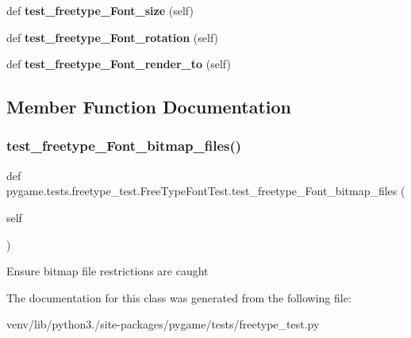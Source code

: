 \begin{DoxyCompactItemize}
def {\bfseries test\+\_\+freetype\+\_\+\+Font\+\_\+size} (self)
\item 
\mbox{\label{classpygame_1_1tests_1_1freetype__test_1_1_free_type_font_test_a16d7f968ed53f3d8fe22819a3d83440b}} 
def {\bfseries test\+\_\+freetype\+\_\+\+Font\+\_\+rotation} (self)
\item 
\mbox{\label{classpygame_1_1tests_1_1freetype__test_1_1_free_type_font_test_a6f72ba8f6d0e317b2aec8b9e5d7ef366}} 
def {\bfseries test\+\_\+freetype\+\_\+\+Font\+\_\+render\+\_\+to} (self)
\end{DoxyCompactItemize}


\subsection{Member Function Documentation}
\mbox{\label{classpygame_1_1tests_1_1freetype__test_1_1_free_type_font_test_a8e09fa3a283708a2565478d0bacb6c98}} 
\subsubsection{\texorpdfstring{test\+\_\+freetype\+\_\+\+Font\+\_\+bitmap\+\_\+files()}{test\_freetype\_Font\_bitmap\_files()}}
{\footnotesize\ttfamily def pygame.\+tests.\+freetype\+\_\+test.\+Free\+Type\+Font\+Test.\+test\+\_\+freetype\+\_\+\+Font\+\_\+bitmap\+\_\+files (\begin{DoxyParamCaption}\item[{}]{self }\end{DoxyParamCaption})}

\begin{DoxyVerb}Ensure bitmap file restrictions are caught\end{DoxyVerb}
 

The documentation for this class was generated from the following file\+:\begin{DoxyCompactItemize}
\item 
venv/lib/python3./site-\/packages/pygame/tests/freetype\+\_\+test.\+py\end{DoxyCompactItemize}
